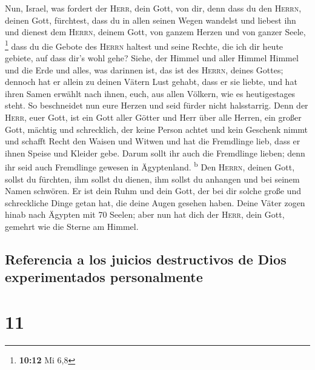  Nun, Israel, was fordert der \textsc{Herr}, dein Gott,
von dir, denn dass du den \textsc{Herrn}, deinen Gott, fürchtest, dass
du in allen seinen Wegen wandelst und liebest ihn und dienest dem
\textsc{Herrn}, deinem Gott, von ganzem Herzen und von ganzer Seele,
\footnote{\textbf{10:12} Mi 6,8}  dass du die Gebote des
\textsc{Herrn} haltest und seine Rechte, die ich dir heute gebiete, auf
dass dir's wohl gehe?  Siehe, der Himmel und aller Himmel
Himmel und die Erde und alles, was darinnen ist, das ist des
\textsc{Herrn}, deines Gottes;  dennoch hat er allein zu
deinen Vätern Lust gehabt, dass er sie liebte, und hat ihren Samen
erwählt nach ihnen, euch, aus allen Völkern, wie es heutigestages steht.
 So beschneidet nun eure Herzen und seid fürder nicht
halsstarrig.  Denn der \textsc{Herr}, euer Gott, ist ein
Gott aller Götter und Herr über alle Herren, ein großer Gott, mächtig
und schrecklich, der keine Person achtet und kein Geschenk nimmt
 und schafft Recht den Waisen und Witwen und hat die
Fremdlinge lieb, dass er ihnen Speise und Kleider gebe. 
Darum sollt ihr auch die Fremdlinge lieben; denn ihr seid auch
Fremdlinge gewesen in Ägyptenland. \textsuperscript{b} 
Den \textsc{Herrn}, deinen Gott, sollst du fürchten, ihm sollst du
dienen, ihm sollst du anhangen und bei seinem Namen schwören.
 Er ist dein Ruhm und dein Gott, der bei dir solche große
und schreckliche Dinge getan hat, die deine Augen gesehen haben.
 Deine Väter zogen hinab nach Ägypten mit 70 Seelen; aber
nun hat dich der \textsc{Herr}, dein Gott, gemehrt wie die Sterne am
Himmel.

\hypertarget{referencia-a-los-juicios-destructivos-de-dios-experimentados-personalmente}{%
\subsection{Referencia a los juicios destructivos de Dios experimentados
personalmente}\label{referencia-a-los-juicios-destructivos-de-dios-experimentados-personalmente}}

\hypertarget{section-10}{%
\section{11}\label{section-10}}

